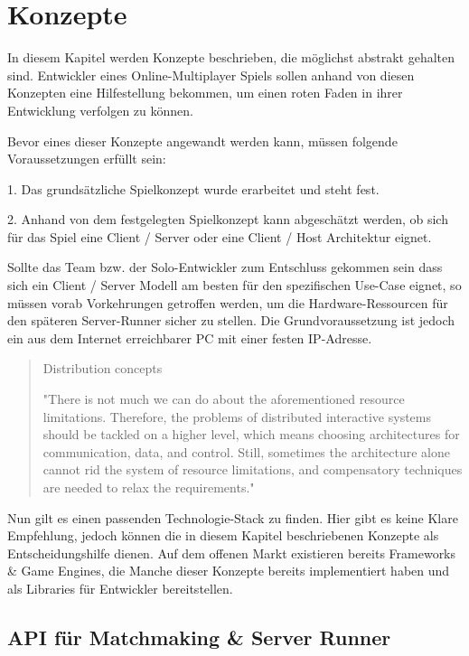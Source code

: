 \chapter{Konzepte}
\label{sec:konzepte}

In diesem Kapitel werden Konzepte beschrieben, die möglichst abstrakt gehalten sind. Entwickler eines Online-Multiplayer Spiels sollen anhand von diesen Konzepten eine Hilfestellung bekommen, um einen roten Faden in ihrer Entwicklung verfolgen zu können.

Bevor eines dieser Konzepte angewandt werden kann, müssen folgende Voraussetzungen erfüllt sein:

1. Das grundsätzliche Spielkonzept wurde erarbeitet und steht fest.

2. Anhand von dem festgelegten Spielkonzept kann abgeschätzt werden, ob sich für das Spiel eine Client / Server oder eine Client / Host Architektur eignet.

Sollte das Team bzw. der Solo-Entwickler zum Entschluss gekommen sein dass sich ein Client / Server Modell am besten für den spezifischen Use-Case eignet, so müssen vorab Vorkehrungen getroffen werden, um die Hardware-Ressourcen für den späteren Server-Runner sicher zu stellen. Die Grundvoraussetzung ist jedoch ein aus dem Internet erreichbarer PC mit einer festen IP-Adresse.

\begin{quote}
	Distribution concepts
	
	"There is not much we can do about the aforementioned resource limitations. Therefore, the problems of distributed interactive systems should be tackled on a higher level, which means choosing architectures for communication, data, and control. Still, sometimes the architecture alone cannot rid the system of resource limitations, and compensatory techniques are needed to relax the requirements." \cite{Smed.2002}
\end{quote}


Nun gilt es einen passenden Technologie-Stack zu finden. Hier gibt es keine Klare Empfehlung, jedoch können die in diesem Kapitel beschriebenen Konzepte als Entscheidungshilfe dienen. Auf dem offenen Markt existieren bereits Frameworks \& Game Engines, die Manche dieser Konzepte bereits implementiert haben und als Libraries für Entwickler bereitstellen.

\cite{MFatihMAR.2021}


\section{API für Matchmaking \& Server Runner}

